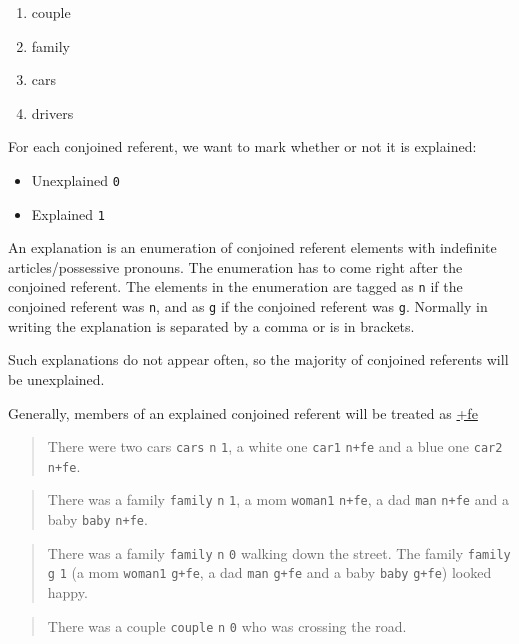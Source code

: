 \documentclass[
]{book}
\providecommand{\tightlist}{%
  \setlength{\itemsep}{0pt}\setlength{\parskip}{0pt}}
\begin{document}
\begin{enumerate}
\def\labelenumi{\arabic{enumi}.}
\tightlist
\item
  couple
\item
  family
\item
  cars
\item
  drivers
\end{enumerate}

For each conjoined referent, we want to mark whether or not it is explained:

\begin{itemize}
\tightlist
\item
  Unexplained \texttt{0}
\item
  Explained \texttt{1}
\end{itemize}

An explanation is an enumeration of conjoined referent elements with indefinite articles/possessive pronouns.
The enumeration has to come right after the conjoined referent.
The elements in the enumeration are tagged as \texttt{n} if the conjoined referent was \texttt{n}, and as \texttt{g} if the conjoined referent was \texttt{g}.
Normally in writing the explanation is separated by a comma or is in brackets.

Such explanations do not appear often, so the majority of conjoined referents will be unexplained.

Generally, members of an explained conjoined referent will be treated as \protect\hyperlink{further-explanation}{+fe}

\begin{quote}
There were two cars \texttt{cars} \texttt{n} \texttt{1}, a white one \texttt{car1} \texttt{n+fe} and a blue one \texttt{car2} \texttt{n+fe}.
\end{quote}

\begin{quote}
There was a family \texttt{family} \texttt{n} \texttt{1}, a mom \texttt{woman1} \texttt{n+fe}, a dad \texttt{man} \texttt{n+fe} and a baby \texttt{baby} \texttt{n+fe}.
\end{quote}

\begin{quote}
There was a family \texttt{family} \texttt{n} \texttt{0} walking down the street. The family \texttt{family} \texttt{g} \texttt{1} (a mom \texttt{woman1} \texttt{g+fe}, a dad \texttt{man} \texttt{g+fe} and a baby \texttt{baby} \texttt{g+fe}) looked happy.
\end{quote}

\begin{quote}
There was a couple \texttt{couple} \texttt{n} \texttt{0} who was crossing the road.
\end{quote}
\end{document}
